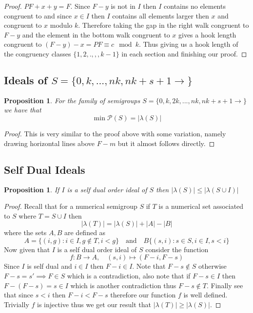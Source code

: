 \documentclass[11pt,letterpaper]{article}
\newtheorem{prop}[thm]{Proposition}
\theoremstyle{definition}
\begin{document}
\begin{proof}
$PF+x+y=F$. Since $F-y$ is not in $I$ then $I$ contains no elements congruent to and since $x\in I$ then $I$ contains all elements larger then $x$ and congruent to $x$ modulo $k$. Therefore taking the gap in the right walk congruent to $F-y$ and the element in the bottom walk congruent to $x$ gives a hook length congruent to $(F-y)-x=PF\equiv c\mod k$. Thus giving us a hook length of the congruency classes $\{1,2,.,,,k-1\}$ in each section and finishing our proof.
\end{proof}



\newpage

\begin{center}
    \section{Ideals of $S=\{0,k,...,nk,nk+s+1\rightarrow\}$}
\end{center}




\begin{prop}
    For the family of semigroups $S=\{0,k,2k,...,nk,nk+s+1\rightarrow\}$ we have that 
    \[\min\mathcal{P}(S)=|\lambda(S)|\]
\end{prop}

\begin{proof}
    This is very similar to the proof above with some variation, namely drawing horizontal lines above $F-m$ but it almost follows directly.
\end{proof}



\newpage

\begin{center}
    \section{Self Dual Ideals}
\end{center}

\begin{prop}
    If $I$ is a self dual order ideal of $S$ then $|\lambda(S)|\leq|\lambda(S\cup I)|$
\end{prop}

\begin{proof}
    Recall that for a numerical semigroup $S$ if $T$ is a numerical set associated to $S$ where $T=S\cup I$ then \[|\lambda(T)|=|\lambda(S)|+|A|-|B|\] where the sets $A,B$ are defined as 
    \[A=\{(i,g):i\in I,g\notin T, i<g\}\quad\text{and}\quad B\{(s,i):s\in S,i\in I,s<i\}\]
    Now given that $I$ is a self dual order ideal of $S$ consider the function 
    \[f:B\rightarrow A, \quad (s,i)\mapsto (F-i,F-s)\]
    Since $I$ is self dual and $i\in I$ then $F-i\in I$. Note that $F-s\notin S$ otherwise $F-s=s'\implies F\in S$ which is a contradiction, also note that if $F-s\in I$ then $F-(F-s)=s\in I$ which is another contradiction thus $F-s\notin T$. Finally see that since $s<i$ then $F-i<F-s$ therefore our function $f$ is well defined. Trivially $f$ is injective thus we get our result that $|\lambda(T)|\geq |\lambda(S)|$.
\end{proof}
\end{document}
